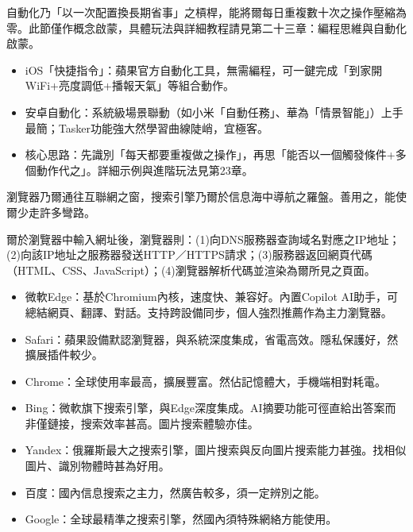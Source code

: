 
自動化乃「以一次配置換長期省事」之槓桿，能將爾每日重複數十次之操作壓縮為零。此節僅作概念啟蒙，具體玩法與詳細教程請見第二十三章：編程思維與自動化啟蒙。

\begin{itemize}
  \item iOS「快捷指令」：蘋果官方自動化工具，無需編程，可一鍵完成「到家開WiFi+亮度調低+播報天氣」等組合動作。
  \item 安卓自動化：系統級場景聯動（如小米「自動任務」、華為「情景智能」）上手最簡；Tasker功能強大然學習曲線陡峭，宜極客。
  \item 核心思路：先識別「每天都要重複做之操作」，再思「能否以一個觸發條件+多個動作代之」。詳細示例與進階玩法見第23章。
\end{itemize}


瀏覽器乃爾通往互聯網之窗，搜索引擎乃爾於信息海中導航之羅盤。善用之，能使爾少走許多彎路。


爾於瀏覽器中輸入網址後，瀏覽器則：(1)向DNS服務器查詢域名對應之IP地址；(2)向該IP地址之服務器發送HTTP／HTTPS請求；(3)服務器返回網頁代碼（HTML、CSS、JavaScript）；(4)瀏覽器解析代碼並渲染為爾所見之頁面。


\begin{itemize}
  \item 微軟Edge：基於Chromium內核，速度快、兼容好。內置Copilot AI助手，可總結網頁、翻譯、對話。支持跨設備同步，個人強烈推薦作為主力瀏覽器。
  \item Safari：蘋果設備默認瀏覽器，與系統深度集成，省電高效。隱私保護好，然擴展插件較少。
  \item Chrome：全球使用率最高，擴展豐富。然佔記憶體大，手機端相對耗電。
\end{itemize}


\begin{itemize}
  \item Bing：微軟旗下搜索引擎，與Edge深度集成。AI摘要功能可徑直給出答案而非僅鏈接，搜索效率甚高。圖片搜索體驗亦佳。
  \item Yandex：俄羅斯最大之搜索引擎，圖片搜索與反向圖片搜索能力甚強。找相似圖片、識別物體時甚為好用。
  \item 百度：國內信息搜索之主力，然廣告較多，須一定辨別之能。
  \item Google：全球最精準之搜索引擎，然國內須特殊網絡方能使用。
\end{itemize}

